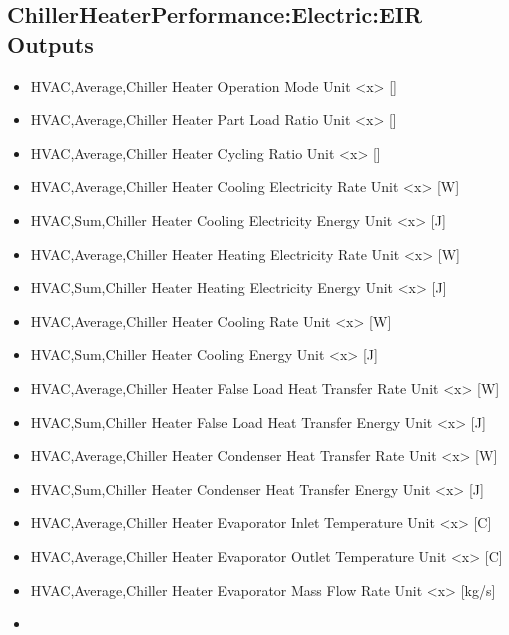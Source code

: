 \subsection{ChillerHeaterPerformance:Electric:EIR Outputs}\label{chillerheaterperformanceelectriceir-outputs}

\begin{itemize}
\item
  HVAC,Average,Chiller Heater Operation Mode Unit \textless{}x\textgreater{} {[]}
\item
  HVAC,Average,Chiller Heater Part Load Ratio Unit \textless{}x\textgreater{} {[]}
\item
  HVAC,Average,Chiller Heater Cycling Ratio Unit \textless{}x\textgreater{} {[]}
\item
  HVAC,Average,Chiller Heater Cooling Electricity Rate Unit \textless{}x\textgreater{} {[}W{]}
\item
  HVAC,Sum,Chiller Heater Cooling Electricity Energy Unit \textless{}x\textgreater{} {[}J{]}
\item
  HVAC,Average,Chiller Heater Heating Electricity Rate Unit \textless{}x\textgreater{} {[}W{]}
\item
  HVAC,Sum,Chiller Heater Heating Electricity Energy Unit \textless{}x\textgreater{} {[}J{]}
\item
  HVAC,Average,Chiller Heater Cooling Rate Unit \textless{}x\textgreater{} {[}W{]}
\item
  HVAC,Sum,Chiller Heater Cooling Energy Unit \textless{}x\textgreater{} {[}J{]}
\item
  HVAC,Average,Chiller Heater False Load Heat Transfer Rate Unit \textless{}x\textgreater{} {[}W{]}
\item
  HVAC,Sum,Chiller Heater False Load Heat Transfer Energy Unit \textless{}x\textgreater{} {[}J{]}
\item
  HVAC,Average,Chiller Heater Condenser Heat Transfer Rate Unit \textless{}x\textgreater{} {[}W{]}
\item
  HVAC,Sum,Chiller Heater Condenser Heat Transfer Energy Unit \textless{}x\textgreater{} {[}J{]}
\item
  HVAC,Average,Chiller Heater Evaporator Inlet Temperature Unit \textless{}x\textgreater{} {[}C{]}
\item
  HVAC,Average,Chiller Heater Evaporator Outlet Temperature Unit \textless{}x\textgreater{} {[}C{]}
\item
  HVAC,Average,Chiller Heater Evaporator Mass Flow Rate Unit \textless{}x\textgreater{} {[}kg/s{]}
\item

\end{itemize}
